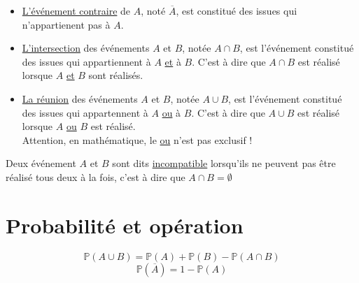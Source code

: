 \documentclass[french]{book}
\begin{document}
\begin{defn}
\begin{itemize}
\item \underline{L'événement contraire} de $A$, noté $\overline{A}$, est constitué des issues qui n'appartienent pas à $A$.
\item \underline{L'intersection} des événements $A$ et $B$, notée $A \cap B$, est l'événement constitué des issues qui appartiennent à $A$ \underline{et} à $B$. C'est à dire que $A \cap B$ est réalisé lorsque $A$ \underline{et} $B$ sont réalisés.
\item \underline{La réunion} des événements $A$ et $B$, notée $A \cup B$, est l'événement constitué des issues qui appartennent à $A$ \underline{ou} à $B$. C'est à dire que $A \cup B$ est réalisé lorsque $A$ \underline{ou} $B$ est réalisé.\\

Attention, en mathématique, le \underline{ou} n'est pas exclusif !

\end{itemize}
\end{defn}

\begin{defn}
Deux événement $A$ et $B$ sont dits \underline{incompatible} lorsqu'ils ne peuvent pas être réalisé tous deux à la fois, c'est à dire que $A \cap B =\emptyset$
\end{defn}


\section{Probabilité et opération}

\begin{prop}
$$\mathbb{P}(A \cup B)=\mathbb{P}(A)+\mathbb{P}(B)-\mathbb{P}(A \cap B)$$
$$\mathbb{P}(\overline{A})= 1-\mathbb{P}(A)$$
\end{prop}
\end{document}
